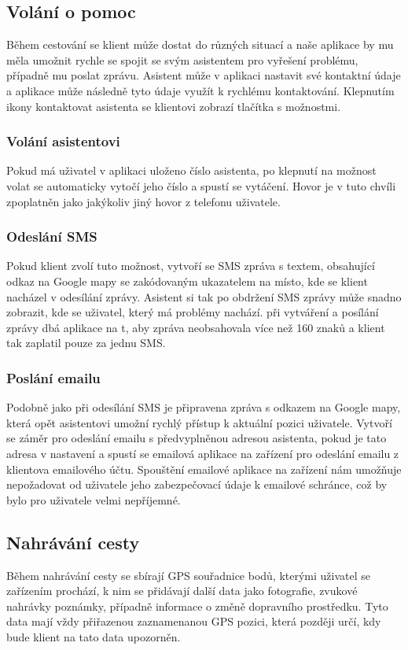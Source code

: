 \documentclass[czech,master,public,dept460,male,java,cpdeclaration]{diploma}
\begin{document}
\subsection{Volání o pomoc}
Během cestování se klient může dostat do různých situací a naše aplikace by mu měla umožnit rychle se
spojit se svým asistentem pro vyřešení problému, případně mu poslat zprávu. Asistent může v aplikaci nastavit své kontaktní
údaje a aplikace může následně tyto údaje využít k rychlému kontaktování. Klepnutím ikony kontaktovat
asistenta se klientovi zobrazí tlačítka s možnostmi.

\subsubsection{Volání asistentovi}
Pokud má uživatel v aplikaci uloženo číslo asistenta, po klepnutí na možnost volat se automaticky
vytočí jeho číslo a spustí se vytáčení. Hovor je v tuto chvíli zpoplatněn jako jakýkoliv jiný hovor
z telefonu uživatele.

\subsubsection{Odeslání SMS}
Pokud klient zvolí tuto možnost, vytvoří se SMS zpráva s textem, obsahující odkaz na Google mapy
se zakódovaným ukazatelem na místo, kde se klient nacházel v odesílání zprávy. Asistent si tak po obdržení
SMS zprávy může snadno zobrazit, kde se uživatel, který má problémy nachází. při vytváření a posílání zprávy
dbá aplikace na t, aby zpráva neobsahovala více než 160 znaků a klient tak zaplatil pouze za jednu SMS.

\subsubsection{Poslání emailu}
Podobně jako při odesílání SMS je připravena zpráva s odkazem na Google mapy, která opět asistentovi
umožní rychlý přístup k aktuální pozici uživatele. Vytvoří se záměr pro odeslání emailu s předvyplněnou
adresou asistenta, pokud je tato adresa v nastavení a spustí se emailová aplikace na zařízení pro odeslání
emailu z klientova emailového účtu. Spouštění emailové aplikace na zařízení nám umožňuje nepožadovat
od uživatele jeho zabezpečovací údaje k emailové schránce, což by bylo pro uživatele velmi nepříjemné.



\subsection{Nahrávání cesty}
Během nahrávání cesty se sbírají GPS souřadnice bodů, kterými uživatel se zařízením prochází,
k nim se přidávají další data jako fotografie, zvukové nahrávky poznámky,
případně informace o změně dopravního prostředku. Tyto data mají vždy přiřazenou zaznamenanou
GPS pozici, která později určí, kdy bude klient na tato data upozorněn.
\end{document}
